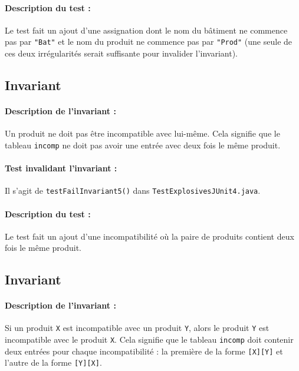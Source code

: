 \documentclass{article}
\begin{document}
\vspace{-0.2cm}
\paragraph{Description du test :} Le test fait un ajout d'une assignation dont le nom du bâtiment ne commence pas par \texttt{"Bat"} et le nom du produit ne commence pas par \texttt{"Prod"} (une seule de ces deux irrégularités serait suffisante pour invalider l'invariant).

\subsection{Invariant }

\paragraph{Description de l'invariant :} Un produit ne doit pas être incompatible avec lui-même. Cela signifie que le tableau \texttt{incomp} ne doit pas avoir une entrée avec deux fois le même produit.

\vspace{-0.2cm}
\paragraph{Test invalidant l'invariant :} Il s'agit de \texttt{testFailInvariant5()} dans \texttt{TestExplosivesJUnit4.java}.

\vspace{-0.2cm}
\paragraph{Description du test :} Le test fait un ajout d'une incompatibilité où la paire de produits contient deux fois le même produit.

\subsection{Invariant }

\paragraph{Description de l'invariant :} Si un produit \texttt{X} est incompatible avec un produit \texttt{Y}, alors le produit \texttt{Y} est incompatible avec le produit \texttt{X}. Cela signifie que le tableau \texttt{incomp} doit contenir deux entrées pour chaque incompatibilité : la première de la forme \texttt{[X][Y]} et l'autre de la forme \texttt{[Y][X]}.
\end{document}

